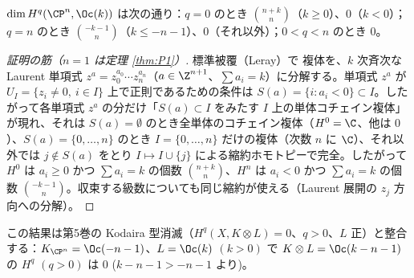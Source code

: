 \begin{thm}[$\CP^n$ 上の $\Oc(k)$]\label{thm:Pn}\tC
$\dim H^q(\CP^n,\Oc(k))$ は次の通り：$q=0$ のとき $\binom{n+k}{n}$（$k\ge0$）、$0$（$k<0$）；$q=n$ のとき $\binom{-k-1}{n}$（$k\le-n-1$）、$0$（それ以外）；$0<q<n$ のとき $0$。
\end{thm}
\begin{proof}[証明の筋（$n=1$ は定理 \ref{thm:P1}）]
標準被覆（Leray）で \Cech{} 複体を、$k$ 次斉次な Laurent 単項式 $z^a=z_0^{a_0}\cdots z_n^{a_n}$（$a\in\Z^{n+1}$、$\sum a_i=k$）に分解する。単項式 $z^a$ が $U_I=\{z_i\ne0,\ i\in I\}$ 上で正則であるための条件は $S(a)=\{i:a_i<0\}\subset I$。したがって各単項式 $z^a$ の分だけ「$S(a)\subset I$ をみたす $I$ 上の単体コチェイン複体」が現れ、それは $S(a)=\emptyset$ のとき全単体のコチェイン複体（$H^0=\C$、他は $0$）、$S(a)=\{0,\dots,n\}$ のとき $I=\{0,\dots,n\}$ だけの複体（次数 $n$ に $\C$）、それ以外では $j\notin S(a)$ をとり $I\mapsto I\cup\{j\}$ による縮約ホモトピーで完全。したがって $H^0$ は $a_i\ge0$ かつ $\sum a_i=k$ の個数 $\binom{n+k}n$、$H^n$ は $a_i<0$ かつ $\sum a_i=k$ の個数 $\binom{-k-1}{n}$。収束する級数についても同じ縮約が使える（Laurent 展開の $z_j$ 方向への分解）。
\end{proof}
\begin{rem}
この結果は第5巻の Kodaira 型消滅（$H^q(X,K\otimes L)=0$、$q>0$、$L$ 正）と整合する：$K_{\CP^n}=\Oc(-n-1)$、$L=\Oc(k)$ $(k>0)$ で $K\otimes L=\Oc(k-n-1)$ の $H^q$ $(q>0)$ は $0$ ($k-n-1>-n-1$ より)。
\end{rem}

